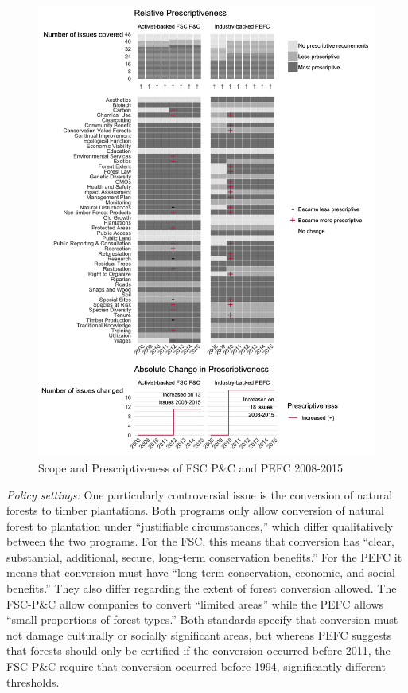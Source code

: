 \documentclass[
      12pt,
            Review ]{article}
\begin{document}
\begin{figure}
\centering
\includegraphics{FSC-PEFC-1.png}
\caption{Scope and Prescriptiveness of FSC P\&C and PEFC 2008-2015}
\end{figure}

\emph{Policy settings:} One particularly controversial issue is the
conversion of natural forests to timber plantations. Both programs only
allow conversion of natural forest to plantation under ``justifiable
circumstances,'' which differ qualitatively between the two programs.
For the FSC, this means that conversion has ``clear, substantial,
additional, secure, long-term conservation benefits.'' For the PEFC it
means that conversion must have ``long-term conservation, economic, and
social benefits.'' They also differ regarding the extent of forest
conversion allowed. The FSC-P\&C allow companies to convert ``limited
areas'' while the PEFC allows ``small proportions of forest types.''
Both standards specify that conversion must not damage culturally or
socially significant areas, but whereas PEFC suggests that forests
should only be certified if the conversion occurred before 2011, the
FSC-P\&C require that conversion occurred before 1994, significantly
different thresholds.
\end{document}
